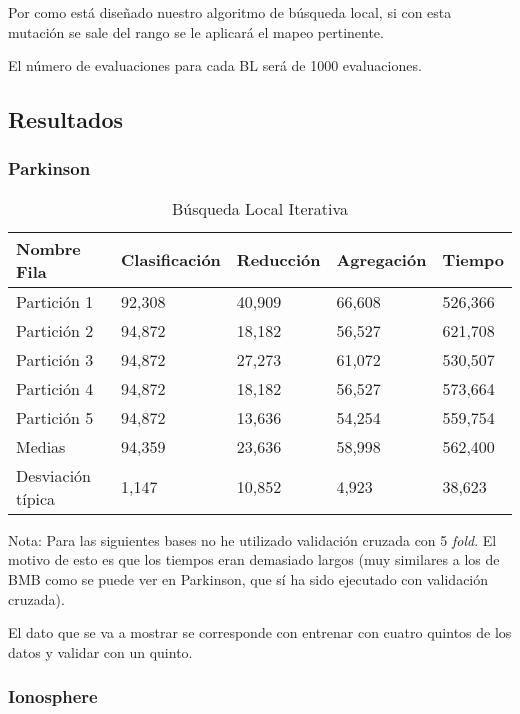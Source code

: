   Por como está diseñado nuestro algoritmo de búsqueda local, si con esta mutación se sale del rango se le aplicará el mapeo pertinente. 

El número de evaluaciones para cada BL será 
de 1000 evaluaciones. 

\subsection{Resultados}

\subsubsection{Parkinson}

\begin{table}[H]
    \centering
    \caption{Búsqueda Local Iterativa}
    \begin{tabular}{|l|l|l|l|l|}
    \hline
        Nombre Fila & Clasificación & Reducción & Agregación & Tiempo \\ \hline
        Partición 1 & 92,308 & 40,909 & 66,608 & 526,366 \\ \hline
        Partición 2 & 94,872 & 18,182 & 56,527 & 621,708 \\ \hline
        Partición 3 & 94,872 & 27,273 & 61,072 & 530,507 \\ \hline
        Partición 4 & 94,872 & 18,182 & 56,527 & 573,664 \\ \hline
        Partición 5 & 94,872 & 13,636 & 54,254 & 559,754 \\ \hline
        Medias  & 94,359 & 23,636 & 58,998 & 562,400 \\ \hline
        Desviación típica & 1,147 & 10,852 & 4,923 & 38,623 \\ \hline
    \end{tabular}
    \label{ILS-Parkinson}
\end{table}


Nota: Para las siguientes bases no he utilizado validación cruzada con 5 \textit{fold}. 
El motivo de esto es que los tiempos eran demasiado largos (muy similares a los de BMB como se puede ver en Parkinson, que sí ha sido ejecutado con validación cruzada). 

El dato que se va a mostrar se corresponde con 
entrenar con cuatro quintos de los datos y validar con un quinto. 


\subsubsection{Ionosphere}

